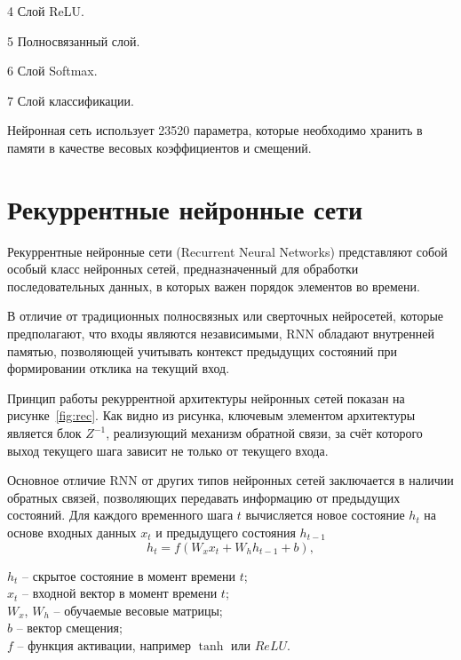   4 Слой ReLU. 

  5 Полносвязанный слой. 

  6 Слой Softmax. 

  7 Слой классификации.

Нейронная сеть использует 23520 параметра, которые необходимо хранить в памяти 
в качестве весовых коэффициентов и смещений.

\section{Рекуррентные нейронные сети}
\hspace*{12.5 mm}Рекуррентные нейронные сети (Recurrent Neural Networks) 
представляют собой особый класс нейронных сетей, предназначенный для обработки 
последовательных данных, в которых важен порядок элементов во времени. 

В отличие от традиционных полносвязных или сверточных нейросетей, которые 
предполагают, что входы являются независимыми, RNN обладают внутренней памятью,
позволяющей учитывать контекст предыдущих состояний при формировании отклика на
текущий вход.

Принцип работы рекуррентной архитектуры нейронных сетей показан на 
рисунке~\ref{fig:rec}. Как видно из рисунка, ключевым элементом архитектуры 
является блок $Z^{-1}$, реализующий механизм обратной связи, за счёт 
которого выход текущего шага зависит не только от текущего входа.


\anonsection{}Основное отличие RNN от других типов нейронных сетей 
заключается в наличии обратных связей, позволяющих передавать информацию от 
предыдущих состояний. Для каждого временного шага \( t \) вычисляется новое 
состояние \( h_t \) на основе входных данных \( x_t \) и предыдущего состояния 
\( h_{t-1} \)
\begin{equation}
    h_t = f(W_x x_t + W_h h_{t-1} + b),
\end{equation}

 \( h_t \) – скрытое состояние в момент времени \( t \);\\
\hphantom{где} \( x_t \) – входной вектор в момент времени \( t \);\\
\hphantom{где} \( W_x \), \( W_h \) – обучаемые весовые матрицы;\\
\hphantom{где} \( b \) – вектор смещения;\\
\hphantom{где} \( f \) – функция активации, например \( \tanh \) или \( ReLU \).

